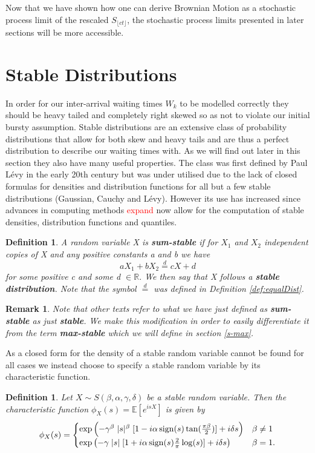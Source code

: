 \documentclass[honours,12pt]{UNSWthesis}
\newcommand{\R}{\mathbb{R}}
\newcommand{\E}{\mathbb{E}}
\newcommand{\1}{\mathbf 1}
\newcommand{\sign}{\mathop{\rm sign}}
\newtheorem{definition}[theorem]{Definition}
\newtheorem{remark}[theorem]{Remark}
\numberwithin{equation}{section}
\theoremstyle{definition}
\theoremstyle{remark}
\begin{document}
Now that we have shown how one can derive Brownian Motion as a stochastic process limit of the rescaled $S_{\lfloor ct\rfloor}$, the stochastic process limits presented in later sections will be more accessible.
\section{Stable Distributions}
In order for our inter-arrival waiting times $W_k$ to be modelled correctly they should be heavy tailed and completely right skewed so as not to violate our initial bursty assumption. Stable distributions are an extensive class of probability distributions that allow for both skew and heavy tails and are thus a perfect distribution to describe our waiting times with. As we will find out later in this section they also have many useful properties. The class was first defined by Paul L\'{e}vy in the early 20th century but was under utilised due to the lack of closed formulas for densities and distribution functions for all but a few stable distributions (Gaussian, Cauchy and L\'{e}vy). However its use has increased since advances in computing methods \textcolor{red}{expand} now allow for the computation of stable densities, distribution functions and quantiles.\\
\begin{definition}\cite{Nolan2015}
A random variable X is \textbf{sum-stable} if for $X_1$ and $X_2$ independent copies of X and any positive constants a and b we have
\[
	aX_1+bX_2\overset{d}{=}cX+d
\]
for some positive c and some d $\in\R.$ We then say that X follows a \textbf{stable distribution}. Note that the symbol $\overset{d}{=}$ was defined in Definition \ref{def:equalDist}.\\
\end{definition}
\begin{remark}
Note that other texts refer to what we have just defined as \textbf{sum-stable} as just \textbf{stable}. We make this modification in order to easily differentiate it from the term \textbf{max-stable} which we will define in section \ref{s-max}.\\
\end{remark}

\noindent As a closed form for the density of a stable random variable cannot be found for all cases we instead choose to specify a stable random variable by its characteristic function.\\
\begin{definition}\label{def:stableChar}
Let $X\sim S(\beta,\alpha,\gamma,\delta)$ be a stable random variable. Then the characteristic function $\phi_X(s)=\E[e^{isX}]$ is given by
\begin{align}
	\phi_X(s)=\begin{cases}
			\exp\left(-\gamma^\beta \; |s|^\beta \; [1-i\alpha \sign(s)\tan(\frac{\pi\beta}{2})]+i\delta s\right) &\beta\neq1\\
			\exp\left(-\gamma \; |s| \; [1+i\alpha \sign(s)\frac{2}{\pi}\log(s)]+i\delta s\right) &\beta=1.
			\end{cases} 
\end{align}\\
\end{definition}
\end{document}
